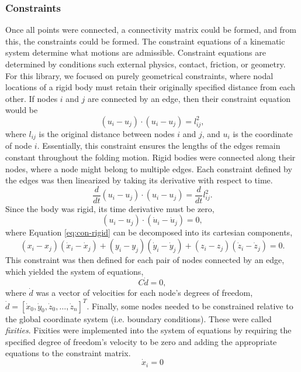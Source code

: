 \subsubsection{Constraints}
Once all points were connected, a connectivity matrix could be formed, and from this, the constraints could be formed. 
The constraint equations of a kinematic system determine what motions are admissible. Constraint equations are determined by conditions such external physics, contact, friction, or geometry. For this library, we focused on purely geometrical constraints, where nodal locations of a rigid body must retain their originally specified distance from each other. If nodes $i$ and $j$ are connected by an edge, then their constraint equation would be
\begin{equation}\label{eq:edge}
    (u_i-u_j) \cdot (u_i-u_j) = l_{ij}^2,
\end{equation}
where $l_{ij}$ is the original distance between nodes $i$ and $j$, and $u_i$ is the coordinate of node $i$. Essentially, this constraint ensures the lengths of the edges remain constant throughout the folding motion.
Rigid bodies were connected along their nodes, where a node might belong to multiple edges. Each constraint defined by the edges was then linearized by taking its derivative with respect to time.
\begin{equation}\label{eq:con-linearized}
\frac{d}{dt}(u_i-u_j) \cdot (u_i-u_j) = \frac{d}{dt}l_{ij}^2.
\end{equation}
Since the body was rigid, its time derivative must be zero,
\begin{equation}\label{eq:con-rigid}
(u_i-u_j) \cdot (\dot u_i-\dot u_j) = 0,
\end{equation}
where Equation \ref{eq:con-rigid} can be decomposed into its cartesian components,
\begin{equation}\label{eq:con-components}
(x_i-x_j) (\dot x_i - \dot x_j)+(y_i-y_j) (\dot y_i - \dot y_j)+(z_i-z_j) (\dot z_i - \dot z_j) =0.
\end{equation}
This constraint was then defined for each pair of nodes connected by an edge, which yielded the system of equations,
\begin{equation}\label{eq:con-system}
C \dot d = 0,
\end{equation}
where $\dot d$ was a vector of velocities for each node's degrees of freedom,
$\dot d = [\dot x_0,\dot y_0,\dot z_0,\dots,\dot z_n]^T$.
Finally, some nodes needed to be constrained relative to the global coordinate system (i.e. boundary conditions). These were called \textit{fixities}. Fixities were implemented into the system of equations by requiring the specified degree of freedom's velocity to be zero and adding the appropriate equations to the constraint matrix.
\begin{equation}\label{eq:con-fixities}
\dot x_i = 0 
\end{equation}

